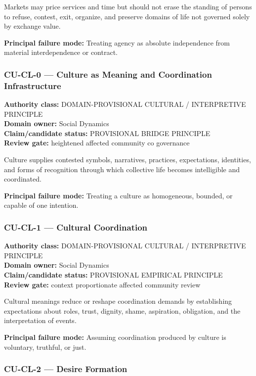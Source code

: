 \documentclass[
  11pt,
]{article}
\begin{document}
Markets may price services and time but should not erase the standing of
persons to refuse, contest, exit, organize, and preserve domains of life
not governed solely by exchange value.

\textbf{Principal failure mode:} Treating agency as absolute
independence from material interdependence or contract.

\subsubsection{CU-CL-0 --- Culture as Meaning and Coordination
Infrastructure}\label{cu-cl-0-culture-as-meaning-and-coordination-infrastructure}

\textbf{Authority class:} DOMAIN-PROVISIONAL CULTURAL / INTERPRETIVE
PRINCIPLE\\
\textbf{Domain owner:} Social Dynamics\\
\textbf{Claim/candidate status:} PROVISIONAL BRIDGE PRINCIPLE\\
\textbf{Review gate:} heightened affected community co governance

Culture supplies contested symbols, narratives, practices, expectations,
identities, and forms of recognition through which collective life
becomes intelligible and coordinated.

\textbf{Principal failure mode:} Treating a culture as homogeneous,
bounded, or capable of one intention.

\subsubsection{CU-CL-1 --- Cultural
Coordination}\label{cu-cl-1-cultural-coordination}

\textbf{Authority class:} DOMAIN-PROVISIONAL CULTURAL / INTERPRETIVE
PRINCIPLE\\
\textbf{Domain owner:} Social Dynamics\\
\textbf{Claim/candidate status:} PROVISIONAL EMPIRICAL PRINCIPLE\\
\textbf{Review gate:} context proportionate affected community review

Cultural meanings reduce or reshape coordination demands by establishing
expectations about roles, trust, dignity, shame, aspiration, obligation,
and the interpretation of events.

\textbf{Principal failure mode:} Assuming coordination produced by
culture is voluntary, truthful, or just.

\subsubsection{CU-CL-2 --- Desire
Formation}\label{cu-cl-2-desire-formation}
\end{document}
